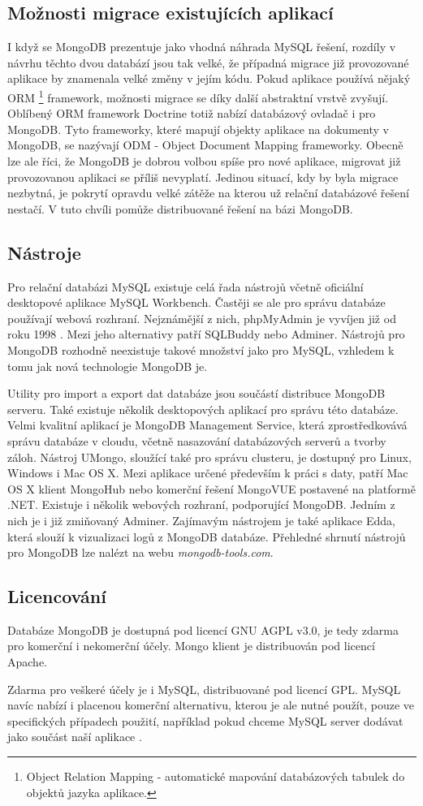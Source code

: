 \subsection{Možnosti migrace existujících aplikací}
I když se MongoDB prezentuje jako vhodná náhrada MySQL řešení, rozdíly v návrhu těchto dvou databází jsou tak velké,  že případná migrace již provozované aplikace by znamenala velké změny v jejím kódu. Pokud aplikace používá nějaký ORM \footnote{Object Relation Mapping - automatické mapování databázových tabulek do objektů jazyka aplikace.} framework, možnosti migrace se díky další abstraktní vrstvě zvyšují. Oblíbený ORM framework Doctrine totiž nabízí databázový ovladač i pro MongoDB. Tyto frameworky, které mapují objekty aplikace na dokumenty v MongoDB, se nazývají ODM - Object Document Mapping frameworky. Obecně lze ale říci, že MongoDB je dobrou volbou spíše pro nové aplikace, migrovat již provozovanou aplikaci se příliš nevyplatí. Jedinou situací, kdy by byla migrace nezbytná, je pokrytí opravdu velké zátěže na kterou už relační databázové řešení nestačí. V tuto chvíli pomůže distribuované řešení na bázi MongoDB.

\subsection{Nástroje}
Pro relační databázi MySQL existuje celá řada nástrojů včetně oficiální desktopové aplikace MySQL Workbench. Častěji se ale pro správu databáze používají webová rozhraní. Nejznámější z nich, phpMyAdmin je vyvíjen již od roku 1998 \cite{phpMyAdmin}. Mezi jeho alternativy patří SQLBuddy nebo Adminer. Nástrojů pro MongoDB rozhodně neexistuje takové množství jako pro MySQL, vzhledem k tomu jak nová technologie MongoDB je. 

Utility pro import a export dat databáze jsou součástí distribuce MongoDB serveru. Také existuje několik desktopových aplikací pro správu této databáze. Velmi kvalitní aplikací je MongoDB Management Service, která zprostředkovává správu databáze v cloudu, včetně nasazování databázových serverů a tvorby záloh. Nástroj UMongo,  sloužící také pro správu clusteru, je dostupný pro Linux, Windows i Mac OS X.  Mezi aplikace určené především k práci s daty, patří Mac OS X klient MongoHub nebo komerční řešení MongoVUE postavené na platformě .NET. Existuje i několik webových rozhraní, podporující MongoDB. Jedním z nich je i již zmiňovaný Adminer. Zajímavým nástrojem je také aplikace Edda, která slouží k vizualizaci logů z MongoDB databáze. Přehledné shrnutí nástrojů pro MongoDB lze nalézt na webu \emph{mongodb-tools.com}.

\subsection{Licencování}
Databáze MongoDB je dostupná pod licencí GNU AGPL v3.0, je tedy zdarma pro komerční i nekomerční účely. Mongo klient je distribuován pod licencí Apache.

Zdarma pro veškeré účely je i MySQL, distribuované pod licencí GPL. MySQL navíc nabízí i placenou komerční alternativu, kterou je ale nutné použít, pouze ve specifických případech použití, například pokud chceme MySQL server dodávat jako součást naší aplikace \cite{payMysql}.
